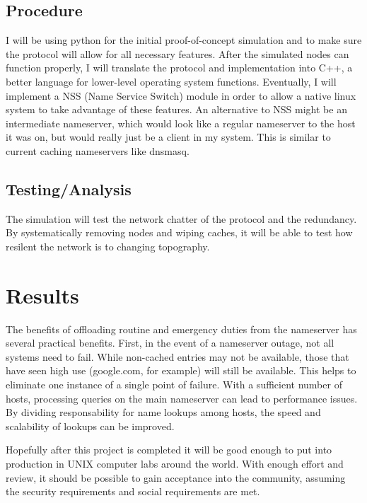 \documentclass[12pt,letterpaper,titlepage]{article}
\begin{document}
\subsection{Procedure}
I will be using python for the initial proof-of-concept simulation and to make sure the protocol will allow for all necessary features. After the simulated nodes can function properly, I will translate the protocol and implementation into C++, a better language for lower-level operating system functions. Eventually, I will implement a NSS (Name Service Switch) module in order to allow a native linux system to take advantage of these features. An alternative to NSS might be an intermediate nameserver, which would look like a regular nameserver to the host it was on, but would really just be a client in my system. This is similar to current caching nameservers like dnsmasq.
\subsection{Testing/Analysis}
The simulation will test the network chatter of the protocol and the redundancy. By systematically removing nodes and wiping caches, it will be able to test how resilent the network is to changing topography.
\section{Results}
The benefits of offloading routine and emergency duties from the nameserver has several practical benefits. First, in the event of a nameserver outage, not all systems need to fail. While non-cached entries may not be available, those that have seen high use (google.com, for example) will still be available. This helps to eliminate one instance of a single point of failure. With a sufficient number of hosts, processing queries on the main nameserver can lead to performance issues. By dividing responsability for name lookups among hosts, the speed and scalability of lookups can be improved.

Hopefully after this project is completed it will be good enough to put into production in UNIX computer labs around the world. With enough effort and review, it should be possible to gain acceptance into the community, assuming the security requirements and social requirements are met.
\end{document}
